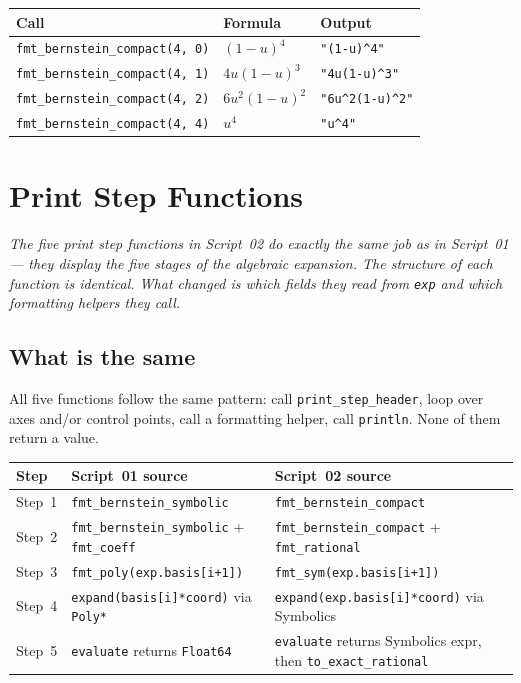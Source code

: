 \documentclass[12pt, a4paper]{article}
\newcommand{\cd}[1]{\texttt{#1}}
\begin{document}
\begin{examplebox}
\begin{tabular}{lll}
\toprule
Call & Formula & Output \\
\midrule
\cd{fmt\_bernstein\_compact(4, 0)} & $(1-u)^4$        & \cd{"(1-u)\^{}4"} \\
\cd{fmt\_bernstein\_compact(4, 1)} & $4u(1-u)^3$      & \cd{"4u(1-u)\^{}3"} \\
\cd{fmt\_bernstein\_compact(4, 2)} & $6u^2(1-u)^2$    & \cd{"6u\^{}2(1-u)\^{}2"} \\
\cd{fmt\_bernstein\_compact(4, 4)} & $u^4$            & \cd{"u\^{}4"} \\
\bottomrule
\end{tabular}
\end{examplebox}


\section{Print Step Functions}

\textit{The five print step functions in Script~02 do exactly
the same job as in Script~01 --- they display the five stages
of the algebraic expansion.
The structure of each function is identical.
What changed is which fields they read from \cd{exp}
and which formatting helpers they call.}

\subsection{What is the same}

All five functions follow the same pattern:
call \cd{print\_step\_header}, loop over axes and/or control
points, call a formatting helper, call \cd{println}.
None of them return a value.

\begin{center}
\begin{tabular}{lp{5cm}p{5cm}}
\toprule
Step & Script~01 source & Script~02 source \\
\midrule
Step~1 & \cd{fmt\_bernstein\_symbolic} & \cd{fmt\_bernstein\_compact} \\
Step~2 & \cd{fmt\_bernstein\_symbolic} + \cd{fmt\_coeff} & \cd{fmt\_bernstein\_compact} + \cd{fmt\_rational} \\
Step~3 & \cd{fmt\_poly(exp.basis[i+1])} & \cd{fmt\_sym(exp.basis[i+1])} \\
Step~4 & \cd{expand(basis[i]*coord)} via \cd{Poly*} & \cd{expand(exp.basis[i]*coord)} via Symbolics \\
Step~5 & \cd{evaluate} returns \cd{Float64} & \cd{evaluate} returns Symbolics expr, then \cd{to\_exact\_rational} \\
\bottomrule
\end{tabular}
\end{center}
\end{document}

